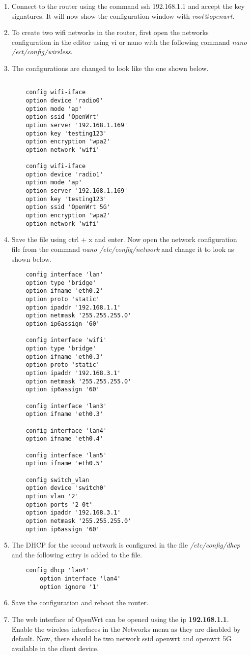 \begin{enumerate}
	\item Connect to the router using the command ssh 192.168.1.1 and accept the key signatures. It will now show the configuration window with \textit{root@openwrt}.
	\item To create two wifi networks in the router, first open the networks configuration in the editor using vi or nano with the following command \textit{nano /ect/config/wireless}.
	\item The configurations are changed to look like the one shown below.
	\begin{lstlisting}
	
	config wifi-iface
	option device 'radio0'
	option mode 'ap'
	option ssid 'OpenWrt'
	option server '192.168.1.169'
	option key 'testing123'
	option encryption 'wpa2'
	option network 'wifi'
	
	config wifi-iface
	option device 'radio1'
	option mode 'ap'
	option server '192.168.1.169'
	option key 'testing123'
	option ssid 'OpenWrt 5G'
	option encryption 'wpa2'
	option network 'wifi'
	\end{lstlisting}
	\item Save the file using ctrl + x and enter. Now open the network configuration file from the command \textit{nano /etc/config/network} and change it to look as shown below.
	\begin{lstlisting}
	config interface 'lan'
	option type 'bridge'
	option ifname 'eth0.2'
	option proto 'static'
	option ipaddr '192.168.1.1'
	option netmask '255.255.255.0'
	option ip6assign '60'
	
	config interface 'wifi'
	option type 'bridge'
	option ifname 'eth0.3'
	option proto 'static'
	option ipaddr '192.168.3.1'
	option netmask '255.255.255.0'
	option ip6assign '60'
	
	config interface 'lan3'
	option ifname 'eth0.3'
	
	config interface 'lan4'
	option ifname 'eth0.4'
	
	config interface 'lan5'
	option ifname 'eth0.5'
	
	config switch_vlan
	option device 'switch0'
	option vlan '2'
	option ports '2 0t'
	option ipaddr '192.168.3.1'
	option netmask '255.255.255.0'
	option ip6assign '60'

	\end{lstlisting}
	\item The DHCP for the second network is configured in the file \textit{/etc/config/dhcp} and the following entry is added to the file.
	\begin{lstlisting}
	config dhcp 'lan4'
		option interface 'lan4'
		option ignore '1'
	\end{lstlisting}
	\item Save the configuration and reboot the router.
	\item The web interface of OpenWrt can be opened using the ip \textbf{192.168.1.1}. Enable the wireless interfaces in the Networks menu as they are disabled by default. Now, there should be two network ssid openwrt and openwrt 5G available in the client device.
	
\end{enumerate}
